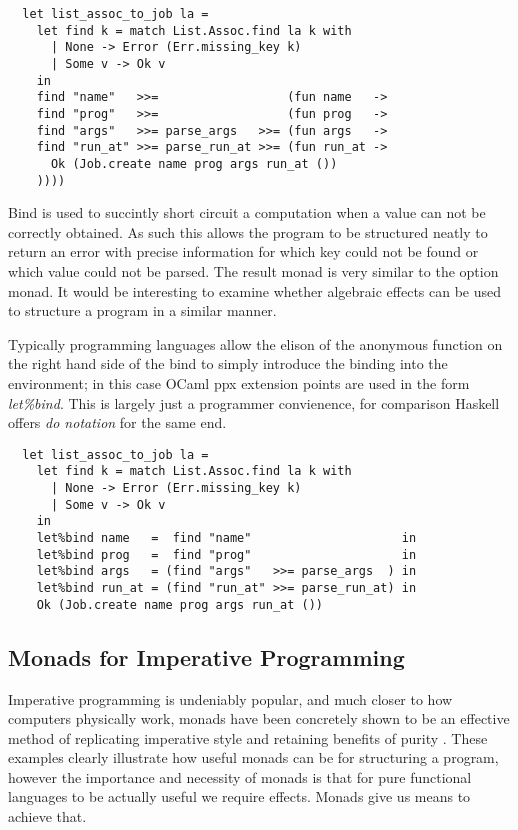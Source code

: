 \documentclass[a4paper,10pt]{article}
\theoremstyle{definition}
\begin{document}
\begin{verbatim}
  let list_assoc_to_job la =
    let find k = match List.Assoc.find la k with
      | None -> Error (Err.missing_key k)
      | Some v -> Ok v
    in
    find "name"   >>=                  (fun name   ->
    find "prog"   >>=                  (fun prog   ->
    find "args"   >>= parse_args   >>= (fun args   ->
    find "run_at" >>= parse_run_at >>= (fun run_at ->
      Ok (Job.create name prog args run_at ())
    ))))
\end{verbatim}

Bind is used to succintly short circuit a computation when a value can not be
correctly obtained. As such this allows the program to be structured neatly to return
an error with precise information for which key could not be found or which value could
not be parsed. The result monad is very similar to the option monad. It would be interesting
to examine whether algebraic effects can be used to structure a program in a similar manner.

Typically programming languages allow the elison of the anonymous function on the right hand side
of the bind to simply introduce the binding into the environment;
in this case OCaml ppx extension points are used in the form \textit{let\%bind}.
This is largely just a programmer convienence,
for comparison Haskell offers \textit{do notation} for the same end.

\begin{verbatim}
  let list_assoc_to_job la =
    let find k = match List.Assoc.find la k with
      | None -> Error (Err.missing_key k)
      | Some v -> Ok v
    in
    let%bind name   =  find "name"                     in
    let%bind prog   =  find "prog"                     in
    let%bind args   = (find "args"   >>= parse_args  ) in
    let%bind run_at = (find "run_at" >>= parse_run_at) in
    Ok (Job.create name prog args run_at ())
\end{verbatim}

\subsection{Monads for Imperative Programming}
Imperative programming is undeniably popular, and much closer to how computers physically work,
monads have been concretely shown to be an effective method of replicating
imperative style and retaining benefits of purity \cite{PeytonJones:1993}.
These examples clearly illustrate how useful monads can be for structuring a program,
however the importance and necessity of monads is that for pure functional languages
to be actually useful we require effects. Monads give us means to achieve that.
\end{document}
